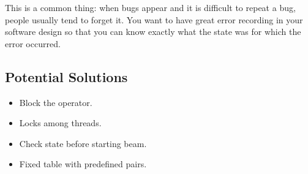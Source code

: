 \documentclass[psamsfonts]{amsart}
\begin{document}
This is a common thing: when bugs appear and it is difficult to repeat a bug, people usually tend to forget it. You want to have great error recording in your software design so that you can know exactly what the state was for which the error occurred. 

\subsection{Potential Solutions}

\begin{itemize}
\item Block the operator.
\item Locks among threads.
\item Check state before starting beam.
\item Fixed table with predefined pairs.
\end{itemize}
\end{document}
